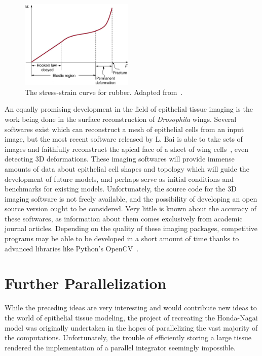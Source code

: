 \begin{figure}
  \begin{center}
    \includegraphics[width=0.48\textwidth]{../diagrams/rubber.jpeg}
  \end{center}
  \caption{The stress-strain curve for rubber. Adapted from~\cite{rubr}.}
\label{fig:rubber}
\end{figure}

An equally promising development in the field of epithelial tissue imaging is the work being done in the surface reconstruction of \emph{Drosophila} wings. Several softwares exist which can reconstruct a mesh of epithelial cells from an input image, but the most recent software released by L. Bai is able to take sets of images and faithfully reconstruct the apical face of a sheet of wing cells~\cite{CellSurf}, even detecting 3D deformations. These imaging softwares will provide immense amounts of data about epithelial cell shapes and topology which will guide the development of future models, and perhaps serve as initial conditions and benchmarks for existing models. Unfortunately, the source code for the 3D imaging software is not freely available, and the possibility of developing an open source version ought to be considered. Very little is known about the accuracy of these softwares, as information about them comes exclusively from academic journal articles. Depending on the quality of these imaging packages, competitive programs may be able to be developed in a short amount of time thanks to advanced libraries like Python's OpenCV~\cite{OpenCV}.

\section{Further Parallelization}
While the preceding ideas are very interesting and would contribute new ideas to the world of epithelial tissue modeling, the project of recreating the Honda-Nagai model was originally undertaken in the hopes of parallelizing the vast majority of the computations. Unfortunately, the trouble of efficiently storing a large tissue rendered the implementation of a parallel integrator seemingly impossible. 

